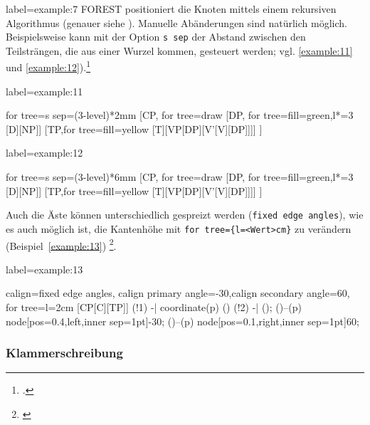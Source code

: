 \begin{lfgwcode}{label={example:7}}
FOREST positioniert die Knoten mittels einem rekursiven Algorithmus (genauer siehe 
\cite[Kap.\,2.4]{zivanovic:forest}). Manuelle Abänderungen sind natürlich möglich. Beispielsweise
kann mit der Option 
\texttt{s sep} der Abstand zwischen den Teilsträngen, die aus einer Wurzel kommen, 
gesteuert werden; vgl. \ref{example:11} und
\ref{example:12}).\footnote{\cite[Beispiel\,27]{zivanovic:forest}.}


\begin{lfgwexample}{label={example:11}}
\begin{forest}
for tree={s sep=(3-level)*2mm}
[CP, for tree=draw
[DP, for tree={fill=green},l*=3
[D][NP]]
[TP,for tree={fill=yellow}
[T][VP[DP][V’[V][DP]]]]
]
\end{forest}
\end{lfgwexample}

\begin{lfgwexample}{label={example:12}}
\begin{forest}
for tree={s sep=(3-level)*6mm}
[CP, for tree=draw
[DP, for tree={fill=green},l*=3
[D][NP]]
[TP,for tree={fill=yellow}
[T][VP[DP][V’[V][DP]]]]
]
\end{forest}
\end{lfgwexample}

Auch die Äste können unterschiedlich gespreizt werden (\texttt{fixed edge angles}),
wie es auch möglich ist, die Kantenhöhe mit \verb|for tree={l=<Wert>cm}| zu verändern 
(Beispiel~\ref{example:13})
\footnote{\cite[Beispiel\,59]{zivanovic:forest}}.

\begin{lfgwexample}{label={example:13}}
\begin{forest}
calign=fixed edge angles,
calign primary angle=-30,calign secondary angle=60,
for tree={l=2cm}
[CP[C][TP]]
\draw[dotted] (!1) -| coordinate(p) () (!2) -| ();
\path ()--(p) node[pos=0.4,left,inner sep=1pt]{-30};
\path ()--(p) node[pos=0.1,right,inner sep=1pt]{60};
\end{forest}
\end{lfgwexample}

\subsubsection{Klammerschreibung}


\end{lfgwcode}
